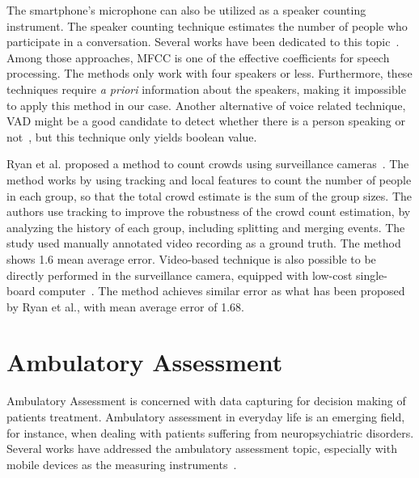 	The smartphone's microphone can also be utilized as a speaker counting instrument. The speaker counting technique estimates the number of people who participate in a conversation. Several works have been dedicated to this topic~\cite{thesis067,thesis074,thesis071}. Among those approaches, \ac{MFCC} is one of the effective coefficients for speech processing. The methods only work with four speakers or less.
	Furthermore, these techniques require \textit{a priori} information about the speakers, making it impossible to apply this method in our case. Another alternative of voice related technique, VAD might be a good candidate to detect whether there is a person speaking or not~\cite{thesis070}, but this technique only yields boolean value.
	
	Ryan et al. proposed a method to count crowds using surveillance cameras~\cite{thesis034}. The method works by using tracking and local features to count the number of people in each group, so that the total crowd estimate is the sum of the group sizes. The authors use tracking to improve the robustness of the crowd count estimation, by analyzing the history of each group, including splitting and merging events. The study used manually annotated video recording as a ground truth. The method shows 1.6 mean average error. Video-based technique is also possible to be directly performed in the surveillance camera, equipped with low-cost single-board computer~\cite{thesis055}. The method achieves similar error as what has been proposed by Ryan et al., with mean average error of 1.68.



	





\section{Ambulatory Assessment} %
\label{sec:ambulatory_assessment}
Ambulatory Assessment is concerned with data capturing for decision making of patients treatment. Ambulatory assessment in everyday life is an emerging field, for instance, when dealing with patients suffering from neuropsychiatric disorders. Several works have addressed the ambulatory assessment topic, especially with mobile devices as the measuring instruments~\cite{thesis001,thesis031,thesis030,thesis015}.

